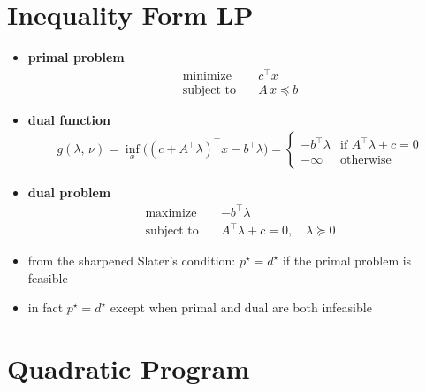 \documentclass[11pt]{extarticle}
\theoremstyle{definition}
\begin{document}
\newpage

\section*{Inequality Form LP}

\begin{itemize}\setlength\itemsep{0em}
  \item {\bf primal problem}
    \begin{align*}
      \text{minimize}\quad & c^\top x \\
      \text{subject to}\quad & A\,x \preccurlyeq b 
    \end{align*}
  \item {\bf dual function} 
    \begin{align*}
      g(\lambda,\,\nu) = \inf_x\big((c + A^\top\lambda)^\top x - b^\top\lambda\big) = \begin{cases} -b^\top\lambda & \text{if } A^\top\lambda + c = 0 \\ -\infty & \text{otherwise} \end{cases}
    \end{align*}
  \item {\bf dual problem}
    \begin{align*}
      \text{maximize}\quad & -b^\top\lambda \\
      \text{subject to}\quad & A^\top\lambda + c = 0, \quad \lambda\succcurlyeq 0 
    \end{align*}
  \item from the sharpened Slater's condition: $p^\star = d^\star$ if the primal problem is feasible
  \item in fact $p^\star = d^\star$ except when primal and dual are both infeasible
\end{itemize}

\newpage

\section*{Quadratic Program}
\end{document}
